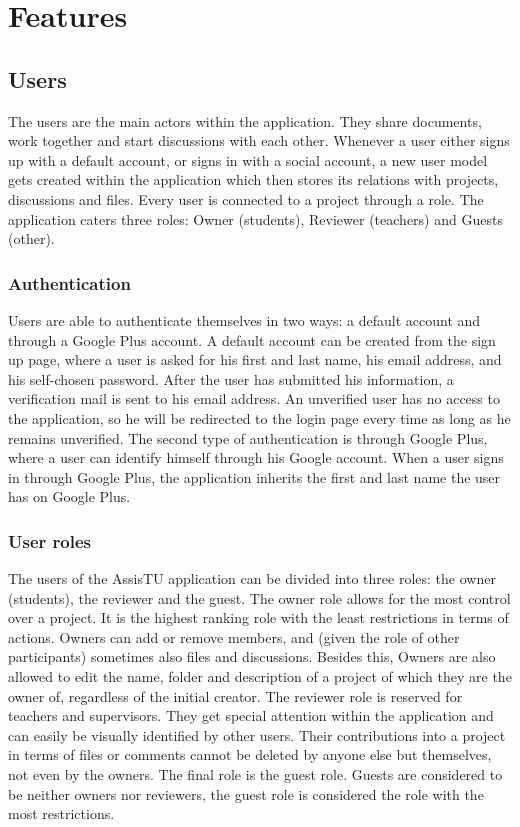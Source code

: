 \chapter{Features}
\section{Users}

The users are the main actors within the application. They share documents, work together and start discussions with each other. Whenever
a user either signs up with a default account, or signs in with a social account, a new user model gets created within the application which then
stores its relations with projects, discussions and files. Every user is connected to a project through a role. The application caters three roles: 
Owner (students), Reviewer (teachers) and Guests (other).

\subsection{Authentication}

Users are able to authenticate themselves in two ways: a default account and through a Google Plus account. A default account can be created from the 
sign up page, where a user is asked for his first and last name, his email address, and his self-chosen password. After the user has submitted his 
information, a verification mail is sent to his email address. An unverified user has no access to the application, so he will be redirected to the 
login page every time as long as he remains unverified. The second type of authentication is through
Google Plus, where a user can identify himself through his Google account. When a user signs in through Google Plus, the application inherits
the first and last name the user has on Google Plus.

\subsection{User roles}

The users of the AssisTU application can be divided into three roles: the owner (students), the reviewer and the guest. The owner role allows for the 
most control over a project. It is the highest ranking role with the least restrictions in terms of actions.
Owners can add or remove members, and (given the role of other participants) sometimes also files and discussions. Besides this, Owners are also 
allowed to edit the name, folder and description of a project of which they are the owner of, regardless of the initial creator. 
The reviewer role is reserved for teachers and supervisors. They get special attention within the application and can easily be visually identified by 
other users. Their contributions into a project in terms of files or comments cannot be deleted by anyone else but themselves, not even by the owners. 
The final role is the guest role. Guests are considered to be neither owners nor reviewers, the guest role is considered the role with the most 
restrictions.

